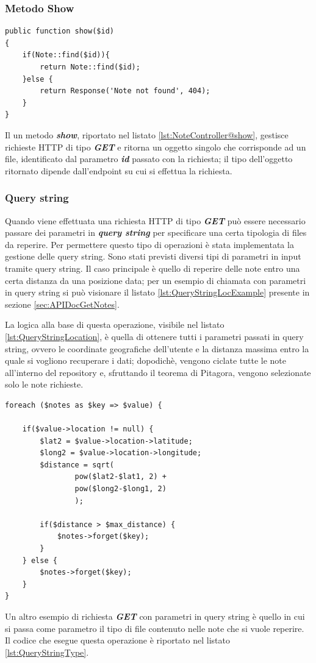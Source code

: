 \pagebreak
\subsubsection{Metodo Show}
\begin{lstlisting}[caption={Funzione \textit{\textbf{show}} del controller NoteController}, label={lst:NoteController@show}]
public function show($id) 
{
	if(Note::find($id)){
		return Note::find($id);
	}else {
		return Response('Note not found', 404);
	}
}
\end{lstlisting}

Il un metodo \textit{\textbf{show}}, riportato nel listato \ref{lst:NoteController@show}, gestisce richieste HTTP di tipo \textit{\textbf{GET}} e ritorna un oggetto singolo che corrisponde ad un file, identificato dal parametro \textit{\textbf{id}} passato con la richiesta; il tipo dell'oggetto ritornato dipende dall'endpoint su cui si effettua la richiesta.

\subsubsection{Query string}
Quando viene effettuata una richiesta HTTP di tipo \textit{\textbf{GET}} può essere necessario passare dei parametri in \textit{\textbf{query string}} per specificare una certa tipologia di files da reperire.
Per permettere questo tipo di operazioni è stata implementata la gestione delle query string.
Sono stati previsti diversi tipi di parametri in input tramite query string. Il caso principale è quello di reperire delle note entro una certa distanza da una posizione data; per un esempio di chiamata con parametri in query string si può visionare il listato \ref{lst:QueryStringLocExample} presente in sezione \ref{sec:APIDocGetNotes}. 

La logica alla base di questa operazione, visibile nel listato \ref{lst:QueryStringLocation}, è quella di ottenere tutti i parametri passati in query string, ovvero le coordinate geografiche dell'utente e la distanza massima entro la quale si vogliono recuperare i dati; dopodichè, vengono ciclate tutte le note all'interno del repository e, sfruttando il teorema di Pitagora, vengono selezionate solo le note richieste.
\pagebreak
\begin{lstlisting}[caption={Recupero delle note entro una certa distanza da una posizione data}, label={lst:QueryStringLocation}]
foreach ($notes as $key => $value) {

	if($value->location != null) {
		$lat2 = $value->location->latitude;
		$long2 = $value->location->longitude;
		$distance = sqrt(
				pow($lat2-$lat1, 2) +
			 	pow($long2-$long1, 2)
			 	);

		if($distance > $max_distance) {
			$notes->forget($key);
		}    
	} else {
		$notes->forget($key);
	}
}
\end{lstlisting}
\pagebreak
Un altro esempio di richiesta \textit{\textbf{GET}} con parametri in query string è quello in cui si passa come parametro il tipo di file contenuto nelle note che si vuole reperire. Il codice che esegue questa operazione è riportato nel listato \ref{lst:QueryStringType}.

